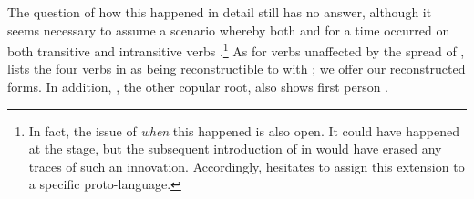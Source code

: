 %
%
The question of how this happened in detail \parencite[107--112]{meira1998proto} still has no answer, although it seems necessary to assume a scenario whereby both  and  for a time occurred on both transitive and intransitive verbs \parencite[112]{meira1998proto}.\footnote{In fact, the issue of \emph{when} this happened is also open. It could have happened at the \PTar stage, but the subsequent introduction of  in \carijo {} would have erased any traces of such an innovation. Accordingly, \textcite{meira1998proto} hesitates to assign this extension to a specific proto-language.}
As for verbs unaffected by the spread of , \textcite{meira1998proto} lists the four verbs in  as being reconstructible to \PTar with ; we offer our reconstructed \PTir forms.
In addition, \trio {} , the other copular root, also shows first person  \parencite[294]{triomeira1999}.

